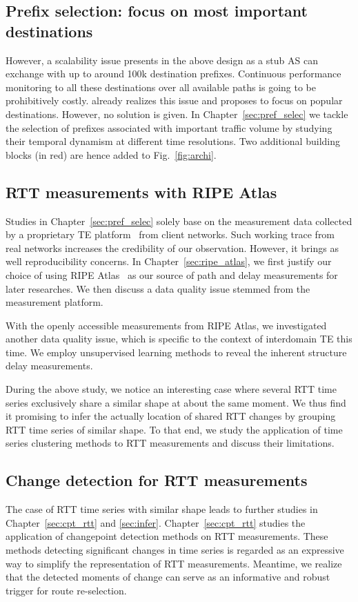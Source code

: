 \subsection{Prefix selection: focus on most important destinations}
However, a scalability issue presents in the above design as a stub AS can exchange with up to around 100k destination prefixes.
Continuous performance monitoring to all these destinations over all available paths is going to be prohibitively costly.
\citet{Feamster2003} already realizes this issue and proposes to focus on popular destinations.
However, no solution is given.
In Chapter~\ref{sec:pref_selec} we tackle the selection of prefixes associated with important traffic volume by studying their temporal dynamism at different time resolutions. Two additional building blocks (in red) are hence added to Fig.~\ref{fig:archi}.

\subsection{RTT measurements with RIPE Atlas}
Studies in Chapter~\ref{sec:pref_selec} solely base on the measurement data collected by a proprietary TE platform~\cite{b6} from client networks. Such working trace from real networks increases the credibility of our observation. However, it brings as well reproducibility concerns.
In Chapter~\ref{sec:ripe_atlas}, we first justify our choice of using RIPE Atlas~\cite{atlas} as our source of path and delay measurements for later researches.
We then discuss a data quality issue stemmed from the measurement platform.

With the openly accessible measurements from RIPE Atlas, we investigated another data quality issue, which is specific to the context of interdomain TE this time. We employ unsupervised learning methods to reveal the inherent structure delay measurements.

During the above study, we notice an interesting case where several RTT time series exclusively share a similar shape at about the same moment.
We thus find it promising to infer the actually location of shared RTT changes by grouping RTT time series of similar shape. To that end, we study the application of time series clustering methods to RTT measurements and discuss their limitations.

\subsection{Change detection for RTT measurements}
The case of RTT time series with similar shape leads to further studies in Chapter~\ref{sec:cpt_rtt} and \ref{sec:infer}. Chapter~\ref{sec:cpt_rtt} studies the application of changepoint detection methods on RTT measurements. These methods detecting significant changes in time series is regarded as an expressive way to simplify the representation of RTT measurements. Meantime, we realize that the detected moments of change can serve as an informative and robust trigger for route re-selection.

